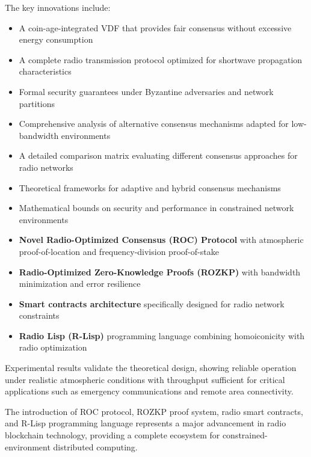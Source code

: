 \documentclass[11pt,a4paper]{article}
\begin{document}
The key innovations include:
\begin{itemize}
\item A coin-age-integrated VDF that provides fair consensus without excessive energy consumption
\item A complete radio transmission protocol optimized for shortwave propagation characteristics
\item Formal security guarantees under Byzantine adversaries and network partitions
\item Comprehensive analysis of alternative consensus mechanisms adapted for low-bandwidth environments
\item A detailed comparison matrix evaluating different consensus approaches for radio networks
\item Theoretical frameworks for adaptive and hybrid consensus mechanisms
\item Mathematical bounds on security and performance in constrained network environments
\item \textbf{Novel Radio-Optimized Consensus (ROC) Protocol} with atmospheric proof-of-location and frequency-division proof-of-stake
\item \textbf{Radio-Optimized Zero-Knowledge Proofs (ROZKP)} with bandwidth minimization and error resilience
\item \textbf{Smart contracts architecture} specifically designed for radio network constraints
\item \textbf{Radio Lisp (R-Lisp)} programming language combining homoiconicity with radio optimization
\end{itemize}

Experimental results validate the theoretical design, showing reliable operation under realistic atmospheric conditions with throughput sufficient for critical applications such as emergency communications and remote area connectivity.

The introduction of ROC protocol, ROZKP proof system, radio smart contracts, and R-Lisp programming language represents a major advancement in radio blockchain technology, providing a complete ecosystem for constrained-environment distributed computing.
\end{document}
